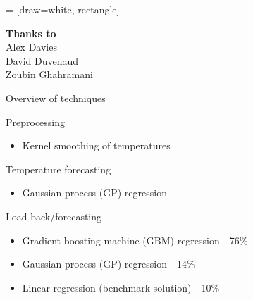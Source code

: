  = [draw=white, rectangle]
\usepackage{ifthen}
\usepackage{booktabs}

\def\simiid{\sim_{\mbox{\tiny iid}}}
\def\ie{i.e.\ }
\def\eg{e.g.\ }




\small

%

\begin{frame}
  \begin{block}{}
    \titlepage
  \end{block}
  \begin{center}
    {\bf  Thanks to}\\
    Alex Davies\\
    David Duvenaud\\
    Zoubin Ghahramani
  \end{center}
\end{frame}

\begin{frame}{Overview of techniques}
  \begin{block}{Preprocessing}
    \begin{itemize}
      \item Kernel smoothing of temperatures
    \end{itemize}
  \end{block}
  \vspace{\baselineskip}
  \begin{block}{Temperature forecasting}
    \begin{itemize}
      \item Gaussian process (GP) regression
    \end{itemize}
  \end{block}
  \vspace{\baselineskip}
  \begin{block}{Load back/forecasting}
    \begin{itemize}
      \item Gradient boosting machine (GBM) regression  - 76\%
      \item Gaussian process (GP) regression - 14\%
      \item Linear regression (benchmark solution) - 10\%
    \end{itemize}
  \end{block}
\end{frame}

